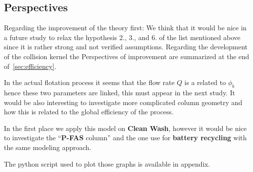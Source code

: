 \subsection{Perspectives}

Regarding the improvement of the theory first:
We think that it would be nice in a future study to relax the hypothesis 2., 3., and 6. of the list mentioned above since it is rather strong and not verified assumptions. 
Regarding the development of the collision kernel the Perspectives of improvement are summarized at the end of~\ref{sec:efficiency}. 

In the actual flotation process it seems that the flow rate $Q$ is a related to $\phi_b$ hence these two parameters are linked, this must appear in the next study. 
It would be also interesting to investigate more complicated column geometry and how this is related to the global efficiency of the process. 


In the first place we apply this model on \textbf{Clean Wash}, however it would be nice to investigate the ``\textbf{P-FAS} column'' and the one use for \textbf{battery recycling} with the same modeling approach. 

The python script used to plot those graphs is available in appendix. 

